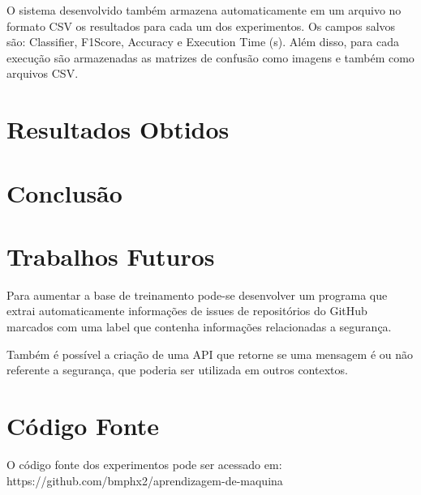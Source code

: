 \documentclass[conference]{IEEEtran}
\begin{document}
O sistema desenvolvido também armazena automaticamente em um arquivo no formato CSV os resultados para cada um dos experimentos. Os campos salvos são: Classifier, F1Score, Accuracy e Execution Time (s). Além disso, para cada execução são armazenadas as matrizes de confusão como imagens e também como arquivos CSV.

\section{Resultados Obtidos}

\section{Conclusão}

\section{Trabalhos Futuros}

Para aumentar a base de treinamento pode-se desenvolver um programa que extrai automaticamente informações de issues de repositórios do GitHub marcados com uma label que contenha informações relacionadas a segurança.

Também é possível a criação de uma API que retorne se uma mensagem é ou não referente a segurança, que poderia ser utilizada em outros contextos.

\section{Código Fonte}

O código fonte dos experimentos pode ser acessado em: https://github.com/bmphx2/aprendizagem-de-maquina



\end{document}
